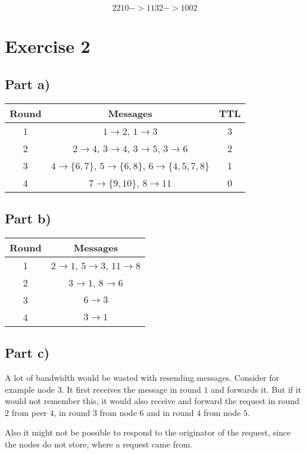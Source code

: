 \documentclass[10pt,a4paper]{article}
\begin{document}
\begin{equation*}
  2210 -> 1132 -> 1002
\end{equation*}

\section*{Exercise 2}

\subsection*{Part a)}

\begin{tabular}{c|c|c}
  Round & Messages & TTL\\
  \hline
  1 & $1 \rightarrow 2$, $1 \rightarrow 3$ & 3\\
  2 & $2 \rightarrow 4$, $3 \rightarrow 4$, $3 \rightarrow 5$, $3 \rightarrow 6$ & 2\\
  3 & $4 \rightarrow \{ 6, 7 \}$, $5 \rightarrow \{ 6, 8 \}$, $6 \rightarrow \{ 4, 5, 7, 8 \}$ & 1 \\
  4 & $7 \rightarrow \{ 9, 10 \}$, $8 \rightarrow 11$ & 0
\end{tabular}

\subsection*{Part b)}

\begin{tabular}{c|c}
  Round & Messages\\
  \hline
  1 & $2 \rightarrow 1$, $5 \rightarrow 3$, $11 \rightarrow 8$\\
  2 & $3 \rightarrow 1$, $8 \rightarrow 6$\\
  3 & $6 \rightarrow 3$\\
  4 & $3 \rightarrow 1$
\end{tabular}

\subsection*{Part c)}

A lot of bandwidth would be wasted with resending messages.
Consider for example node $3$.
It first receives the message in round $1$ and forwards it.
But if it would not remember this, it would also receive and forward the request in round $2$ from peer $4$, in round $3$ from node $6$ and in round $4$ from node $5$.

Also it might not be possible to respond to the originator of the request, since the nodes do not store, where a request came from.
\end{document}
